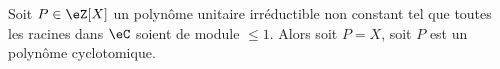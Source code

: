 %
%
%
%

\begin{theorem} \label{ThojCJpFW}
	Soit \( P\in \eZ[X]\) un polynôme unitaire irréductible non constant tel que toutes les racines dans \( \eC\) soient de module \( \leq 1\). Alors soit \( P=X\), soit \( P\) est un polynôme cyclotomique.
\end{theorem}

